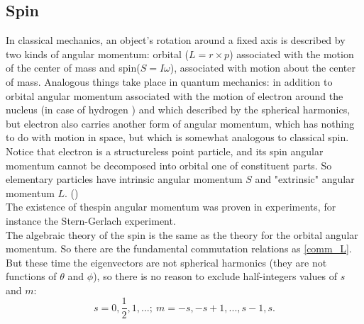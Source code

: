 \documentclass[a4paper, 11pt]{article}
\begin{document}



\subsection{Spin}
In classical mechanics, an object's rotation around a fixed axis  is described by two kinds of angular momentum: orbital ($L = r \times p$) associated with the motion of the center of mass and spin($S = I \omega$), associated with motion about the center of mass.  Analogous things take place in quantum mechanics: in addition to orbital angular momentum associated with the motion of electron around the nucleus (in case of hydrogen ) and which  described by the spherical harmonics, but electron also carries another form of angular momentum, which has nothing to do with motion in space, but which is somewhat analogous to classical spin. Notice that electron is a structureless point particle, and its spin angular momentum cannot be decomposed into orbital one of constituent parts. So elementary particles have intrinsic angular momentum $S$ and "extrinsic" angular momentum $L.$ (\cite{griffiths2016introduction})\\
The existence of thespin angular momentum was proven in experiments, for instance the Stern-Gerlach experiment.\\
The algebraic  theory of  the spin is the same as the theory for the orbital angular momentum. So there are the fundamental commutation relations as \eqref{comm_L}.
But these time the eigenvectors are not spherical harmonics (they are not functions of $\theta$ and $\phi$), so there is no reason to exclude half-integers values of $s$ and $m$:
$$s = 0, \frac{1}{2}, 1, ...;  ~ m = -s, -s+1,...,s-1, s. $$
\end{document}
